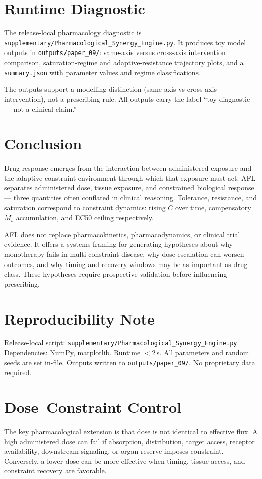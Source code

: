 \documentclass[11pt]{article}
\begin{document}
\section{Runtime Diagnostic}

The release-local pharmacology diagnostic is \texttt{supplementary/Pharmacological\_Synergy\_Engine.py}. It produces toy model outputs in \texttt{outputs/paper\_09/}: same-axis versus cross-axis intervention comparison, saturation-regime and adaptive-resistance trajectory plots, and a \texttt{summary.json} with parameter values and regime classifications.

The outputs support a modelling distinction (same-axis vs cross-axis intervention), not a prescribing rule. All outputs carry the label ``toy diagnostic --- not a clinical claim.''

\section{Conclusion}

Drug response emerges from the interaction between administered exposure and the adaptive constraint environment through which that exposure must act. AFL separates administered dose, tissue exposure, and constrained biological response — three quantities often conflated in clinical reasoning. Tolerance, resistance, and saturation correspond to constraint dynamics: rising $C$ over time, compensatory $M_s$ accumulation, and EC50 ceiling respectively.

AFL does not replace pharmacokinetics, pharmacodynamics, or clinical trial evidence. It offers a systems framing for generating hypotheses about why monotherapy fails in multi-constraint disease, why dose escalation can worsen outcomes, and why timing and recovery windows may be as important as drug class. These hypotheses require prospective validation before influencing prescribing.

\section{Reproducibility Note}

Release-local script: \texttt{supplementary/Pharmacological\_Synergy\_Engine.py}. Dependencies: NumPy, matplotlib. Runtime $< 2$\,s. All parameters and random seeds are set in-file. Outputs written to \texttt{outputs/paper\_09/}. No proprietary data required.


\section{Dose--Constraint Control}
The key pharmacological extension is that dose is not identical to effective flux. A high administered dose can fail if absorption, distribution, target access, receptor availability, downstream signaling, or organ reserve imposes constraint. Conversely, a lower dose can be more effective when timing, tissue access, and constraint recovery are favorable.
\end{document}
